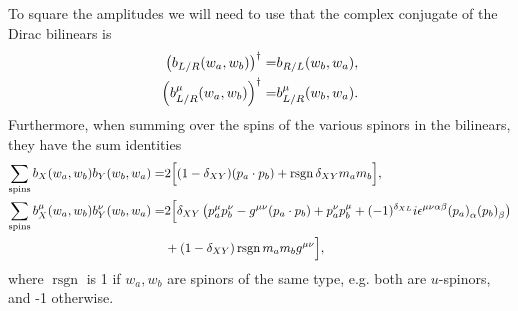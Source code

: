 \documentclass[../main.tex]{subfiles}
\begin{document}
To square the amplitudes we will need to use that the complex conjugate of the Dirac bilinears is
\begin{subequations}
  \begin{align}
    \left(b_{L/R}(w_a, w_b)\right)^\dagger =     & b_{R/L}(w_b, w_a),
    \\
    \left(b_{L/R}^\mu(w_a, w_b)\right)^\dagger = & b_{L/R}^\mu(w_b,
    w_a).
  \end{align}
\end{subequations}
Furthermore, when summing over the spins of the various spinors in the
bilinears, they have the sum identities
\begin{align}
  \sum_{\text{spins}} b_X(w_a, w_b) b_Y(w_b, w_a) =         & 2 \Big[
    (1-\delta_{XY}) (p_a \cdot p_b) + \operatorname{rsgn}
    \delta_{XY} m_a m_b
    \Big],
  \\
  \nonumber
  \sum_{\text{spins}} b_X^\mu(w_a, w_b) b_Y^\nu(w_b, w_a) = & 2\Big[
    \delta_{XY}\pclosed{p_a^\mu p_b^\nu - \g (p_a \cdot p_b) +
      p_a^\nu
      p_b^\mu +
      (-1)^{\delta_{XL}} i \epsilon^{\mu\nu\alpha\beta}
      \tensor{(p_a)}{_\alpha}
  \tensor{(p_b)}{_\beta}}                                             \\
                                                            & +
    (1-\delta_{XY})\operatorname{rsgn} m_a m_b \g \Big],
\end{align}
where \(\operatorname{rsgn}\) is 1 if \(w_a, w_b\) are spinors of the same
type, e.g. both are \(u\)-spinors, and -1 otherwise.
\end{document}
